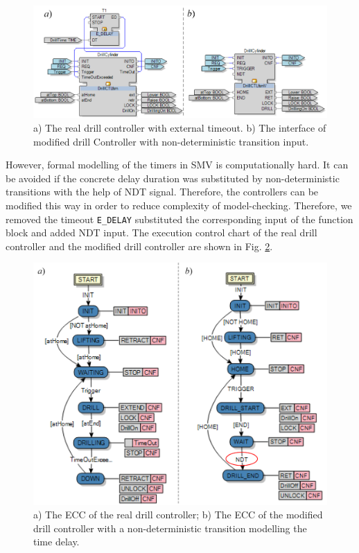 \begin{bibunit}
\begin{figure}[h]
    \centering
    \includegraphics[scale = 0.33]{MX_Papers/Paper2/images/Fig9.png}
    \caption{a) The real drill controller with external timeout. b) The interface of modified drill Controller with non-deterministic transition input.}
    \label{figure:DrillInterfaceControllers}
\end{figure}

However, formal modelling of the timers in SMV is computationally hard. It can be avoided if the concrete delay duration was substituted by non-deterministic transitions with the help of NDT signal. Therefore, the controllers can be modified this way in order to reduce complexity of model-checking. Therefore, we removed the timeout \texttt{E\_DELAY} substituted the corresponding input of the function block and added NDT input. The execution control chart of the real drill controller and the modified drill controller are shown in Fig. \ref{figure:DrillECCControllers}.

\begin{figure}[h]
    \centering
    \includegraphics[scale = 0.24]{MX_Papers/Paper2/images/Fig10.png}
    \caption{a) The ECC of the real drill controller; b) The ECC of the modified drill controller with a non-deterministic transition modelling the time delay.}
    \label{figure:DrillECCControllers}
\end{figure}


\end{bibunit}
